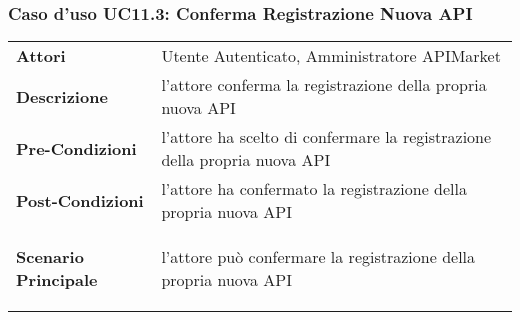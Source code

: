 \subsubsection{Caso d'uso UC11.3: Conferma Registrazione Nuova API}
\label{UC11.3}

\renewcommand*{\arraystretch}{1.6}
\begin{longtable}{ l | p{11cm}}
	\hline
	\rowcolor{Gray}
	\multicolumn{2}{c}{UC11.3: Conferma Registrazione Nuova API} \\
	\hline
	\textbf{Attori} &Utente Autenticato, Amministratore APIMarket \\
	\textbf{Descrizione} & l'attore conferma la registrazione della propria nuova API \\
	\textbf{Pre-Condizioni} & l'attore ha scelto di confermare la registrazione della propria nuova API\\
	\textbf{Post-Condizioni}&l'attore ha confermato la registrazione della propria nuova API\\
	\textbf{Scenario Principale} & \begin{enumerate*}[label=(\arabic*.),itemjoin={\newline}]
		\item l'attore può confermare la registrazione della propria nuova API
	\end{enumerate*}\\
\end{longtable}


